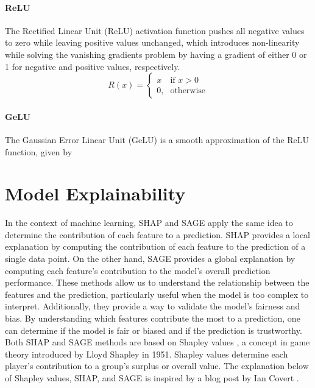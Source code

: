 \paragraph{ReLU}
The Rectified Linear Unit (ReLU) activation function pushes all negative values to zero while leaving positive values unchanged,
which introduces non-linearity while solving the vanishing gradients problem by having a gradient of either 0 or 1 for negative and positive values, respectively.
\begin{equation}\label{eq:relu}
    R(x) = \begin{cases} x & \mbox{if } x > 0 \\ \mbox{0,} & \mbox{otherwise} \end{cases}
\end{equation}

\paragraph{GeLU}
The Gaussian Error Linear Unit (GeLU) is a smooth approximation of the ReLU function, given by


\section{Model Explainability}
In the context of machine learning, SHAP \cite{SHAP} and SAGE \cite{SAGE} apply the same idea to determine the contribution of each feature to a prediction.
SHAP provides a local explanation by computing the contribution of each feature to the prediction of a single data point.
On the other hand, SAGE provides a global explanation by computing each feature's contribution to the model's overall prediction performance.
These methods allow us to understand the relationship between the features and the prediction, particularly useful when the model is too complex to interpret.
Additionally, they provide a way to validate the model's fairness and bias.
By understanding which features contribute the most to a prediction, one can determine if the model is fair or biased and if the prediction is trustworthy.\\

Both SHAP and SAGE methods are based on Shapley values \cite{shapley_value_1953}, a concept in game theory introduced by Lloyd Shapley in 1951.
Shapley values determine each player's contribution to a group's surplus or overall value.
The explanation below of Shapley values, SHAP, and SAGE is inspired by a blog post by Ian Covert \cite{covert_shap_sage}.\\

